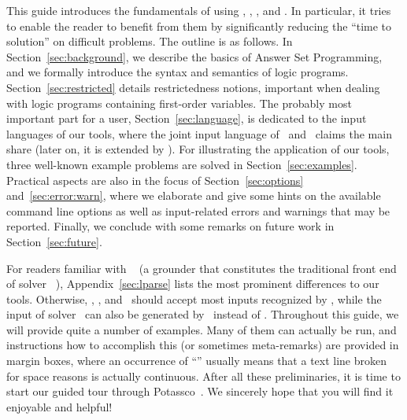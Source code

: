 This guide introduces the fundamentals of using
\gringo, \clasp, \clingo, and \iclingo.
In particular, it tries to enable the reader to benefit from them
by significantly reducing the ``time to solution'' on difficult problems.
The outline is as follows.
In Section~\ref{sec:background},
we describe the basics of Answer Set Programming,
and we formally introduce the syntax and semantics of logic programs.
Section~\ref{sec:restricted} details restrictedness notions,
important when dealing with logic programs containing first-order variables.
The probably most important part for a user, Section~\ref{sec:language},
is dedicated to the input languages of our tools,
where the joint input language of \gringo\ and \clingo\
claims the main share (later on, it is extended by \iclingo).
For illustrating the application of our tools,
three well-known example problems are solved in Section~\ref{sec:examples}.
Practical aspects are also in the focus of Section~\ref{sec:options} and~\ref{sec:error:warn},
where we elaborate and give some hints on the available command line options
as well as input-related errors and warnings that may be reported.
Finally, we conclude with some remarks on future work in Section~\ref{sec:future}.

For readers familiar with \lparse~\cite{lparseManual}
(a grounder that constitutes the traditional front end of solver \smodels~\cite{siniso02a}),
Appendix~\ref{sec:lparse} lists the most prominent differences to our tools.
Otherwise, \gringo, \clingo, and \iclingo\ should accept most inputs recognized by \lparse,
while the input of solver \clasp\ can also be generated by \lparse\ instead of \gringo.
Throughout this guide, we will provide quite a number of examples.
Many of them can actually be run, and instructions how to accomplish this
(or sometimes meta-remarks)
are provided in margin boxes, where an occurrence of ``''
usually means that a text line broken for space reasons is actually continuous.
After all these preliminaries, it is time to start our guided tour
through Potassco~\cite{potassco}.
We sincerely hope that you will find it enjoyable and helpful!

